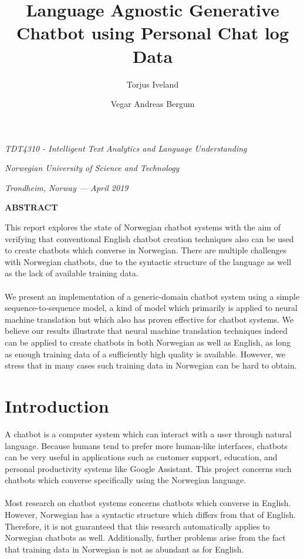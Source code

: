 \documentclass{article}
\title{\textbf{Language Agnostic Generative Chatbot using Personal Chat log
Data}}
\author{Torjus Iveland \and Vegar Andreas Bergum}
\date{}
\renewcommand\abstractname{ABSTRACT}
\renewenvironment{abstract}
 {\small
  \begin{center}
  \bfseries \abstractname\vspace{0em}
  \end{center}
  \list{}{
    \setlength{\leftmargin}{12.5mm}%
    \setlength{\rightmargin}{\leftmargin}%
  }
  \item\relax}
 {\endlist}
\begin{document}
\maketitle
\centerline{\textit{TDT4310 - Intelligent Text Analytics and Language
Understanding}}
\centerline{\textit{Norwegian University of Science and Technology}}
\centerline{\textit{Trondheim, Norway --- April 2019}}
\vspace{6mm} %

\begin{abstract}

This report explores the state of Norwegian chatbot systems with
the aim of verifying that conventional English chatbot creation techniques
also can be used to create chatbots which converse in Norwegian. There are
multiple challenges with Norwegian chatbots, due to the syntactic structure
of the language as well as the lack of available training data.

\paragraph{}
We present an implementation of a generic-domain chatbot system using a simple
sequence-to-sequence model, a kind of model which primarily is applied to
neural machine translation but which also has proven effective for chatbot
systems. We believe our results illustrate that neural machine translation
techniques indeed can be applied to create chatbots in both Norwegian as
well as English, as long as enough training data of a sufficiently high
quality is available. However, we stress that in many cases such training
data in Norwegian can be hard to obtain.

\end{abstract}

\vspace{3mm}

\section*{Introduction}
A chatbot is a computer system which can interact with a user through natural
language. Because humans tend to prefer more human-like interfaces, chatbots
can be very useful in applications such as customer support, education, and
personal productivity systems like Google Assistant. This project concerns
such chatbots which converse specifically using the Norwegian language.

\paragraph{}
Most research on chatbot systems concerns chatbots which converse in English.
However, Norwegian has a syntactic structure which differs from that of
English. Therefore, it is not guaranteed that this research automatically
applies to Norwegian chatbots as well. Additionally, further problems arise
from the fact that training data in Norwegian is not as abundant as for
English.
\end{document}
